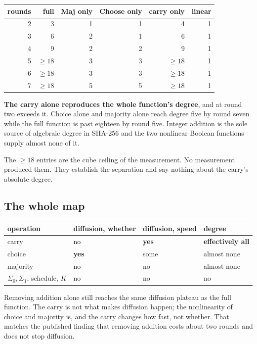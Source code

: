 \begin{center}
\begin{tabular}{rrrrrr}
\toprule
rounds & full & Maj only & Choose only & carry only & linear \\
\midrule
2 & 3 & 1 & 1 & 4 & 1 \\
3 & 6 & 2 & 1 & 6 & 1 \\
4 & 9 & 2 & 2 & 9 & 1 \\
5 & \(\geq 18\) & 3 & 3 & \(\geq 18\) & 1 \\
6 & \(\geq 18\) & 3 & 3 & \(\geq 18\) & 1 \\
7 & \(\geq 18\) & 5 & 5 & \(\geq 18\) & 1 \\
\bottomrule
\end{tabular}
\end{center}

\textbf{The carry alone reproduces the whole function's degree}, and at round two exceeds it. Choice alone and majority alone reach degree five by round seven while the full function is past eighteen by round five. Integer addition is the sole source of algebraic degree in SHA-256 and the two nonlinear Boolean functions supply almost none of it.

The \(\geq 18\) entries are the cube ceiling of the measurement. No measurement produced them. They establish the separation and say nothing about the carry's absolute degree.

\subsection{The whole map}

\begin{center}
\begin{tabular}{llll}
\toprule
operation & diffusion, whether & diffusion, speed & degree \\
\midrule
carry & no & \textbf{yes} & \textbf{effectively all} \\
choice & \textbf{yes} & some & almost none \\
majority & no & no & almost none \\
\(\Sigma_0, \Sigma_1\), schedule, \(K\) & no & no & no \\
\bottomrule
\end{tabular}
\end{center}

Removing addition alone still reaches the same diffusion plateau as the full function. The carry is not what makes diffusion happen; the nonlinearity of choice and majority is, and the carry changes how fast, not whether. That matches the published finding that removing addition costs about two rounds and does not stop diffusion.


